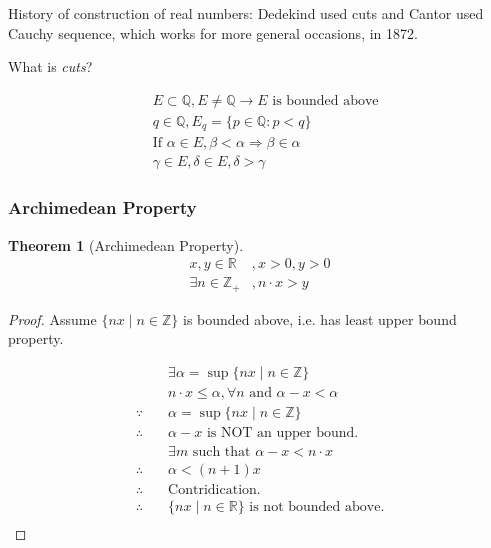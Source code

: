 \documentclass{article}
\newtheorem*{theorem}{Theorem}
\begin{document}
    History of construction of real numbers: Dedekind used cuts and Cantor used Cauchy sequence, which works for more general occasions, in 1872.
    
    What is \textit{cuts}?
    
    \begin{align*}
        &E \subset \mathbb{Q}, E \neq \mathbb{Q} \rightarrow E \text{ is bounded above} \\
        &q \in \mathbb{Q}, E_{q} = \{ p \in \mathbb{Q} : p < q \} \\
        &\text{If } \alpha \in E, \beta < \alpha \Rightarrow \beta \in \alpha \\
        &\gamma \in E, \delta \in E, \delta > \gamma
    \end{align*}
    
    \subsubsection{Archimedean Property}
    
    \begin{theorem}[Archimedean Property]
        \begin{align*}
            x, y \in \mathbb{R}&, x > 0, y > 0 \\
            \exists n \in \mathbb{Z}_{+}&, n \cdot x > y
        \end{align*}
    \end{theorem}

    \begin{proof}
        Assume $\{ nx \mid n \in \mathbb{Z} \}$ is bounded above, i.e. has least upper bound property.
        
        \begin{align*}
            &\exists \alpha = \sup \{ nx \mid n \in \mathbb{Z} \} \\
            &n \cdot x \leq \alpha, \forall n \text{ and } \alpha - x < \alpha \\
            \because \quad &\alpha = \sup \{ nx \mid n \in \mathbb{Z} \} \\
            \therefore \quad &\alpha - x \text{ is NOT an upper bound.} \\
            &\exists m \text{ such that } \alpha - x < n \cdot x \\
            \therefore \quad & \alpha < (n + 1) x \\
            \therefore \quad & \text{Contridication.} \\
            \therefore \quad &\{ nx \mid n \in \mathbb{R} \} \text{ is not bounded above.} \\
        \end{align*}
    \end{proof}
\end{document}
